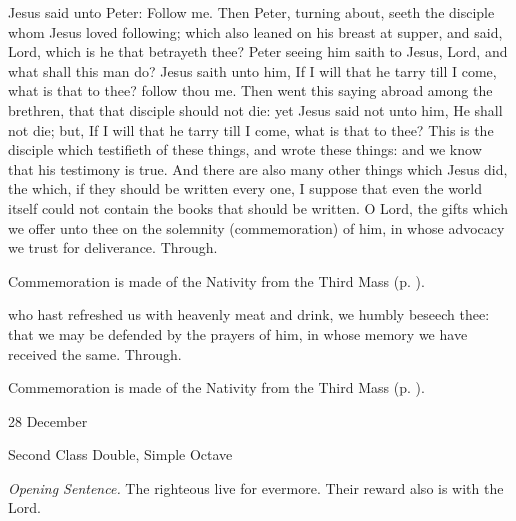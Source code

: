 

 Jesus said unto Peter: Follow me. Then Peter, turning about, seeth the disciple whom Jesus loved following; which also leaned on his breast at supper, and said, Lord, which is he that betrayeth thee? Peter seeing him saith to Jesus, Lord, and what shall this man do? Jesus saith unto him, If I will that he tarry till I come, what is that to thee? follow thou me. Then went this saying abroad among the brethren, that that disciple should not die: yet Jesus said not unto him, He shall not die; but, If I will that he tarry till I come, what is that to thee? This is the disciple which testifieth of these things, and wrote these things: and we know that his testimony is true. And there are also many other things which Jesus did, the which, if they should be written every one, I suppose that even the world itself could not contain the books that should be written.
\secret
{} O Lord, the gifts which we offer unto thee on the solemnity (commemoration) of him, in whose advocacy we trust for deliverance. Through.
\begin{rubric}
    Commemoration is made of the Nativity from the Third Mass (p. \pageref{NativityMassIIISecret}).
\end{rubric}
\postcommunion
{} who hast refreshed us with heavenly meat and drink, we humbly beseech thee: that we may be defended by the prayers of him, in whose memory we have received the same. Through.
\begin{rubric}
    Commemoration is made of the Nativity from the Third Mass (p. \pageref{NativityMassIIIPostcommunion}).
\end{rubric}


\begin{inhead}
{28 December}\par
{Second Class Double, Simple Octave}
\end{inhead}
\par\noindent
\textit{Opening Sentence.} The righteous live for evermore. Their reward also is with the Lord.

